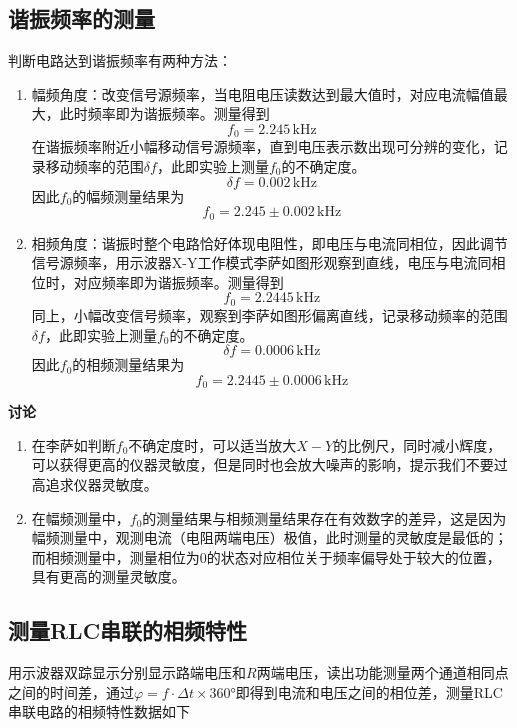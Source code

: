 \documentclass[12pt]{article}
\begin{document}
\subsection{谐振频率的测量}
判断电路达到谐振频率有两种方法：
\begin{enumerate}
    \item 幅频角度：改变信号源频率，当电阻电压读数达到最大值时，对应电流幅值最大，此时频率即为谐振频率。测量得到
    \[
        f_0 = 2.245 \,\text{kHz}
    \]
    在谐振频率附近小幅移动信号源频率，直到电压表示数出现可分辨的变化，记录移动频率的范围$\delta f$，此即实验上测量$f_0$的不确定度。
    \[
        \delta f =0.002\,\text{kHz}
    \]
    因此$f_0$的幅频测量结果为
    \begin{equation}
        f_0 = 2.245 \pm 0.002 \,\text{kHz}
    \end{equation}
    \item 相频角度：谐振时整个电路恰好体现电阻性，即电压与电流同相位，因此调节信号源频率，用示波器X-Y工作模式李萨如图形观察到直线，电压与电流同相位时，对应频率即为谐振频率。测量得到
    \[
        f_0 = 2.2445 \,\text{kHz}
    \]
    同上，小幅改变信号频率，观察到李萨如图形偏离直线，记录移动频率的范围$\delta f$，此即实验上测量$f_0$的不确定度。
    \[
        \delta f =0.0006 \,\text{kHz}
    \]
    因此$f_0$的相频测量结果为
    \begin{equation}
        f_0 = 2.2445 \pm 0.0006 \,\text{kHz}
    \end{equation}
\end{enumerate}
\textbf{讨论}
\begin{enumerate}
    \item 在李萨如判断$f_0$不确定度时，可以适当放大$X-Y$的比例尺，同时减小辉度，可以获得更高的仪器灵敏度，但是同时也会放大噪声的影响，提示我们不要过高追求仪器灵敏度。
    \item 在幅频测量中，$f_0$的测量结果与相频测量结果存在有效数字的差异，这是因为幅频测量中，观测电流（电阻两端电压）极值，此时测量的灵敏度是最低的；而相频测量中，测量相位为0的状态对应相位关于频率偏导处于较大的位置，具有更高的测量灵敏度。
\end{enumerate}
\subsection{测量RLC串联的相频特性}
\quad 用示波器双踪显示分别显示路端电压和$R$两端电压，读出功能测量两个通道相同点之间的时间差，通过$\varphi =f\cdot \Delta t \times 360 \text{°}$即得到电流和电压之间的相位差，测量RLC串联电路的相频特性数据如下
\end{document}
